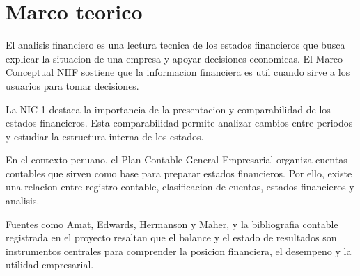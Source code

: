\section{Marco teorico}

El analisis financiero es una lectura tecnica de los estados financieros que busca explicar la situacion de una empresa y apoyar decisiones economicas. El Marco Conceptual NIIF sostiene que la informacion financiera es util cuando sirve a los usuarios para tomar decisiones.

La NIC 1 destaca la importancia de la presentacion y comparabilidad de los estados financieros. Esta comparabilidad permite analizar cambios entre periodos y estudiar la estructura interna de los estados.

En el contexto peruano, el Plan Contable General Empresarial organiza cuentas contables que sirven como base para preparar estados financieros. Por ello, existe una relacion entre registro contable, clasificacion de cuentas, estados financieros y analisis.

Fuentes como Amat, Edwards, Hermanson y Maher, y la bibliografia contable registrada en el proyecto resaltan que el balance y el estado de resultados son instrumentos centrales para comprender la posicion financiera, el desempeno y la utilidad empresarial.
